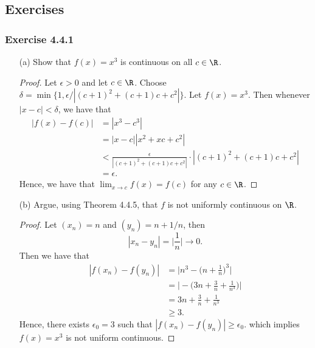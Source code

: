 \subsection{Exercises}

\subsubsection{Exercise 4.4.1}

\begin{enumerate}
    \item[(a)] Show that \( f(x) = x^3  \) is continuous on all \( c \in \R  \).
        \begin{proof}
Let \( \epsilon > 0  \) and let \( c \in \R  \). Choose \( \delta = \min \{ 1, \epsilon / | (c+1)^2 + (c+1)c + c^2 |   \}   \). Let \( f(x) = x^3  \). Then whenever \( | x - c  | < \delta  \), we have that 
\begin{align*}
    | f(x) - f(c)  | &= |  x^3 - c^3  |  \\
                     &=|x - c   | | x^2 + xc + c^2  | \\ 
                     &< \frac{ \epsilon  }{ | (c+1)^2 + (c+1)c + c^2 |  }  \cdot | (c + 1)^2 + (c + 1)c + c^2  |  \\
                     &= \epsilon.
\end{align*}
Hence, we have that \(\lim_{ x  \to c  } f(x) = f(c) \) for any \( c \in \R  \).
        \end{proof}
    \item[(b)] Argue, using Theorem 4.4.5, that \( f  \) is not uniformly continuous on \( \R  \).
        \begin{proof}
            Let \( (x_n) = n    \) and \( (y_n) = n + 1 / n   \), then 
            \[  | x_n - y_n | = \Big| \frac{ 1 }{ n }  \Big| \to 0.  \]
            Then we have that 
            \begin{align*}
                | f(x_n) - f(y_n)  | &= \Big| n^3 - \Big( n + \frac{ 1 }{ n }  \Big)^3  \Big|  \\
                                     &= \Big| - \Big( 3n + \frac{ 3 }{ n } + \frac{ 1 }{ n^3 } \Big) \Big| \\
                                     &= 3n + \frac{ 3 }{ n } + \frac{ 1 }{ n^3 } \\  
                                     &\geq 3.
            \end{align*}
            Hence, there exists \( \epsilon_0 = 3  \) such that \( | f(x_n) - f(y_n) | \geq \epsilon_0. \) which implies \( f(x) = x^3  \) is not uniform continuous.

\end{proof}
\end{enumerate}
